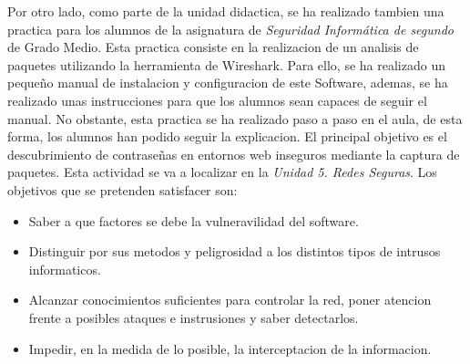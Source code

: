 \documentclass[spanish,12pt, a4paper,twoside]{paper}
\begin{document}
\justify
Por otro lado, como parte de la unidad didactica, se ha realizado tambien una practica para los alumnos de la asignatura de \textit{Seguridad Informática de segundo} de Grado Medio. Esta practica consiste en la realizacion de un analisis de paquetes utilizando la herramienta de Wireshark. Para ello, se ha realizado un pequeño manual de instalacion y configuracion de este Software, ademas, se ha realizado unas instrucciones para que los alumnos sean capaces de seguir el manual. No obstante, esta practica se ha realizado paso a paso en el aula, de esta forma, los alumnos han podido seguir la explicacion. El principal objetivo es el descubrimiento de contraseñas en entornos web inseguros mediante la captura de paquetes. Esta actividad se va a localizar en la \textit{Unidad 5. Redes Seguras}. Los objetivos que se pretenden satisfacer son:
\begin{itemize}
\item Saber a que factores se debe la vulneravilidad del software.
\item Distinguir por sus metodos y peligrosidad a los distintos tipos de intrusos informaticos.
\item Alcanzar conocimientos suficientes para controlar la red, poner atencion frente a posibles ataques e instrusiones y saber detectarlos.
\item Impedir, en la medida de lo posible, la interceptacion de la informacion.
\end{itemize}
\end{document}

